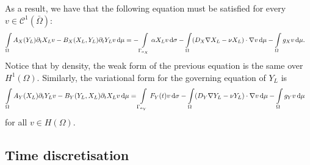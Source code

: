 \documentclass[11pt]{article}
\begin{document}
As a result, we have that the following equation must be satisfied for every $v \in \mathcal{C}^1 (\bar\Omega)$:
\begin{align}
    \int\limits_\Omega
    A_X(Y_L) \partial_t X_L v - B_X(X_L,Y_L) \partial_t Y_L v \dif \mu
    &=
    -\int\limits_{\Gamma_{a_X}}    \alpha X_L v    \dif \sigma
    -\int\limits_\Omega        (D_X \nabla X_L - \nu X_L) \cdot \nabla v  \dif \mu
    -\int\limits_\Omega        g_X v \dif \mu.
\end{align}
Notice that by density, the weak form of the previous equation is the same over $H^1(\Omega)$.
Similarly, the variational form for the governing equation of $Y_L$ is
\begin{align}
    \int\limits_\Omega
    A_Y(X_L) \partial_t Y_L v - B_Y(Y_L,X_L) \partial_t X_L v \dif \mu
    &=
    \int\limits_{\Gamma_{a_Y}}     F_Y(t) v    \dif \sigma
    -\int\limits_\Omega        (D_Y \nabla Y_L - \nu Y_L) \cdot \nabla v  \dif \mu
    -\int\limits_\Omega        g_Y v \dif \mu 
\end{align}
for all \(v \in H(\Omega)\).



\subsection{Time discretisation}
\end{document}
